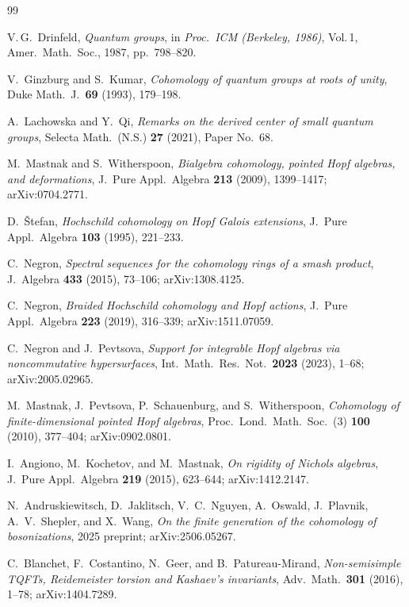 \documentclass[11pt,letterpaper]{amsart}
\theoremstyle{plain}
\theoremstyle{definition}
\theoremstyle{remark}
\begin{document}
\begin{thebibliography}{99}

V.\,G.~Drinfeld, \emph{Quantum groups}, in \emph{Proc.\ ICM (Berkeley, 1986)}, Vol.\,1, Amer.\ Math.\ Soc., 1987, pp.~798--820.

V.~Ginzburg and S.~Kumar, \emph{Cohomology of quantum groups at roots of unity}, Duke Math.\ J.\ \textbf{69} (1993), 179--198.

A.~Lachowska and Y.~Qi, \emph{Remarks on the derived center of small quantum groups}, Selecta Math.\ (N.S.) \textbf{27} (2021), Paper No.\ 68.

M.~Mastnak and S.~Witherspoon, \emph{Bialgebra cohomology, pointed Hopf algebras, and deformations}, J.\ Pure Appl.\ Algebra \textbf{213} (2009), 1399--1417; arXiv:0704.2771.

D.~\v{S}tefan, \emph{Hochschild cohomology on Hopf Galois extensions}, J.\ Pure Appl.\ Algebra \textbf{103} (1995), 221--233.

C.~Negron, \emph{Spectral sequences for the cohomology rings of a smash product}, J.\ Algebra \textbf{433} (2015), 73--106; arXiv:1308.4125.

C.~Negron, \emph{Braided Hochschild cohomology and Hopf actions}, J.\ Pure Appl.\ Algebra \textbf{223} (2019), 316--339; arXiv:1511.07059.

C.~Negron and J.~Pevtsova, \emph{Support for integrable Hopf algebras via noncommutative hypersurfaces}, Int.\ Math.\ Res.\ Not.\ \textbf{2023} (2023), 1--68; arXiv:2005.02965.

M.~Mastnak, J.~Pevtsova, P.~Schauenburg, and S.~Witherspoon, \emph{Cohomology of finite-dimensional pointed Hopf algebras}, Proc.\ Lond.\ Math.\ Soc.\ (3) \textbf{100} (2010), 377--404; arXiv:0902.0801.

I.~Angiono, M.~Kochetov, and M.~Mastnak, \emph{On rigidity of Nichols algebras}, J.\ Pure Appl.\ Algebra \textbf{219} (2015), 623--644; arXiv:1412.2147.

N.~Andruskiewitsch, D.~Jaklitsch, V.~C.~Nguyen, A.~Oswald, J.~Plavnik, A.~V.~Shepler, and X.~Wang, \emph{On the finite generation of the cohomology of bosonizations}, 2025 preprint; arXiv:2506.05267.

C.~Blanchet, F.~Costantino, N.~Geer, and B.~Patureau-Mirand, \emph{Non-semisimple TQFTs, Reidemeister torsion and Kashaev's invariants}, Adv.\ Math.\ \textbf{301} (2016), 1--78; arXiv:1404.7289.


\end{thebibliography}
\end{document}
